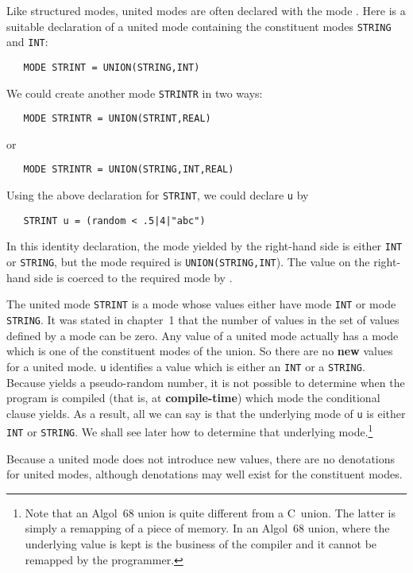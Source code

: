 Like structured modes, united modes are often declared with the mode
. Here is a suitable declaration of
a united mode containing the constituent modes \verb|STRING| and
\verb|INT|:
\begin{verbatim}
   MODE STRINT = UNION(STRING,INT)
\end{verbatim}
\noindent
We could create another mode \verb|STRINTR| in two ways:
\begin{verbatim}
   MODE STRINTR = UNION(STRINT,REAL)
\end{verbatim}
\noindent
or
\begin{verbatim}
   MODE STRINTR = UNION(STRING,INT,REAL)
\end{verbatim}
\noindent
Using the above declaration for \verb|STRINT|, we could declare
\verb|u| by
\begin{verbatim}
   STRINT u = (random < .5|4|"abc")
\end{verbatim}
\noindent
In this identity declaration, the mode yielded by the right-hand side
is either \verb|INT| or \verb|STRING|, but the mode required is
\verb|UNION(STRING,INT|).  The value on the right-hand side is
coerced to the required mode by .

The united mode \verb|STRINT| is a mode whose values either have mode
\verb|INT| or mode \verb|STRING|.  It was stated in chapter~1 that
the number of values in the set of values defined by a mode can be
zero.  Any value of a united mode actually has a mode which is one of
the constituent modes of the union. So there are no \textbf{new}
values for a united mode.  \verb|u| identifies a value which is
either an \verb|INT| or a \verb|STRING|.  Because 
yields a pseudo-random number, it is not possible to determine when
the program is compiled (that is, at  \textbf{compile-time}) which
mode the conditional clause yields.  As a result, all we can say is
that the underlying mode of \verb|u| is either \verb|INT| or
\verb|STRING|.  We shall see later how to determine that underlying
mode.\footnote{Note that an Algol~68 union is quite different from a
C~union. The latter is simply a remapping of a piece of memory. In an
Algol~68 union, where the underlying value is kept is the business of
the compiler and it cannot be remapped by the programmer.}

Because a united mode does not introduce new values, there are no
denotations for united modes, although denotations may well exist for
the constituent modes.

